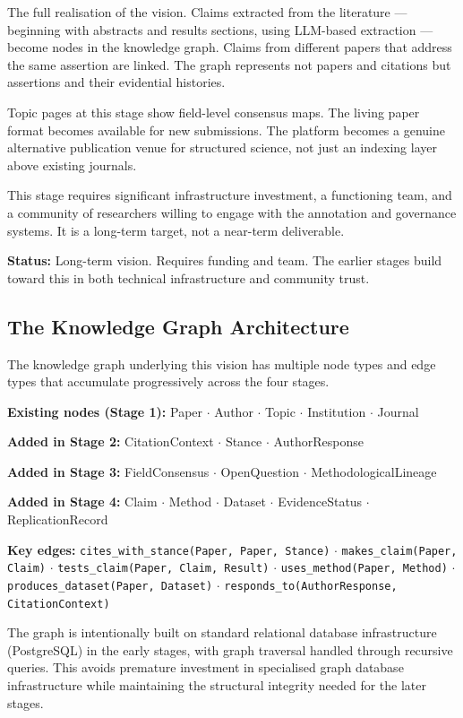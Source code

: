 The full realisation of the vision. Claims extracted from the literature —
beginning with abstracts and results sections, using LLM-based extraction —
become nodes in the knowledge graph. Claims from different papers that address
the same assertion are linked. The graph represents not papers and citations
but assertions and their evidential histories.

Topic pages at this stage show field-level consensus maps. The living paper
format becomes available for new submissions. The platform becomes a genuine
alternative publication venue for structured science, not just an indexing
layer above existing journals.

This stage requires significant infrastructure investment, a functioning team,
and a community of researchers willing to engage with the annotation and
governance systems. It is a long-term target, not a near-term deliverable.

\textbf{Status:} Long-term vision. Requires funding and team. The earlier
stages build toward this in both technical infrastructure and community trust.

\subsection*{The Knowledge Graph Architecture}

The knowledge graph underlying this vision has multiple node types and edge
types that accumulate progressively across the four stages.

\textbf{Existing nodes (Stage 1):}
Paper $\cdot$ Author $\cdot$ Topic $\cdot$ Institution $\cdot$ Journal

\textbf{Added in Stage 2:}
CitationContext $\cdot$ Stance $\cdot$ AuthorResponse

\textbf{Added in Stage 3:}
FieldConsensus $\cdot$ OpenQuestion $\cdot$ MethodologicalLineage

\textbf{Added in Stage 4:}
Claim $\cdot$ Method $\cdot$ Dataset $\cdot$ EvidenceStatus $\cdot$ ReplicationRecord

\textbf{Key edges:}
\texttt{cites\_with\_stance(Paper, Paper, Stance)} $\cdot$
\texttt{makes\_claim(Paper, Claim)} $\cdot$
\texttt{tests\_claim(Paper, Claim, Result)} $\cdot$
\texttt{uses\_method(Paper, Method)} $\cdot$
\texttt{produces\_dataset(Paper, Dataset)} $\cdot$
\texttt{responds\_to(AuthorResponse, CitationContext)}

The graph is intentionally built on standard relational database infrastructure
(PostgreSQL) in the early stages, with graph traversal handled through
recursive queries. This avoids premature investment in specialised graph
database infrastructure while maintaining the structural integrity needed for
the later stages.

